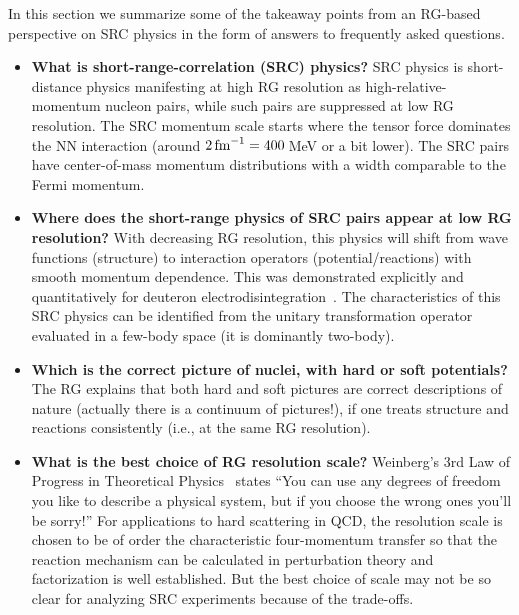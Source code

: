 \documentclass[10pt,aps,prc,floatfix,twocolumn,nofootinbib]{revtex4-1}
\begin{document}

In this section we summarize some of the takeaway points from an RG-based perspective on SRC physics in the form of answers to frequently asked questions.

\begin{itemize}
    \item \textbf{What is short-range-correlation (SRC) physics?}
    SRC physics is short-distance physics manifesting at high RG resolution as high-relative-momentum nucleon pairs, while such pairs are suppressed at low RG resolution.
    The SRC momentum scale starts where the tensor force dominates the NN interaction (around $2\,\mbox{fm}^{-1} = 400$\,MeV or a bit lower).
    The SRC pairs have center-of-mass momentum distributions with a width comparable to the Fermi momentum.

    \item \textbf{Where does the short-range physics of SRC pairs appear at low RG resolution?}
    With decreasing RG resolution, this physics will shift from wave functions (structure) to interaction operators (potential/reactions) with smooth momentum dependence. 
    This was demonstrated explicitly and quantitatively for deuteron electrodisintegration~\cite{More:2015tpa,More:2017syr}.
    The characteristics of this SRC physics can be identified from the unitary transformation operator evaluated in a few-body space (it is dominantly two-body).

   \item\textbf{Which is the correct picture of nuclei, with hard or soft potentials?}
   The RG explains that both hard and soft pictures are correct descriptions of nature (actually there is a continuum of pictures!), if one treats structure and reactions consistently (i.e., at the same RG resolution).
   
   \item\textbf{What is the best choice of RG resolution scale?} 
   Weinberg’s 3rd Law of Progress in Theoretical Physics~\cite{Weinberg:1981qq} states ``You can use any degrees of freedom you like to describe a physical system, but if you choose the wrong ones you’ll be sorry!'' 
   For applications to hard scattering in QCD, the resolution scale is chosen to be of order the characteristic four-momentum transfer so that the reaction mechanism can be calculated in perturbation theory and factorization is well established.
   But the best choice of scale may not be so clear for analyzing SRC experiments because of the trade-offs.
   

\end{itemize}
\end{document}
